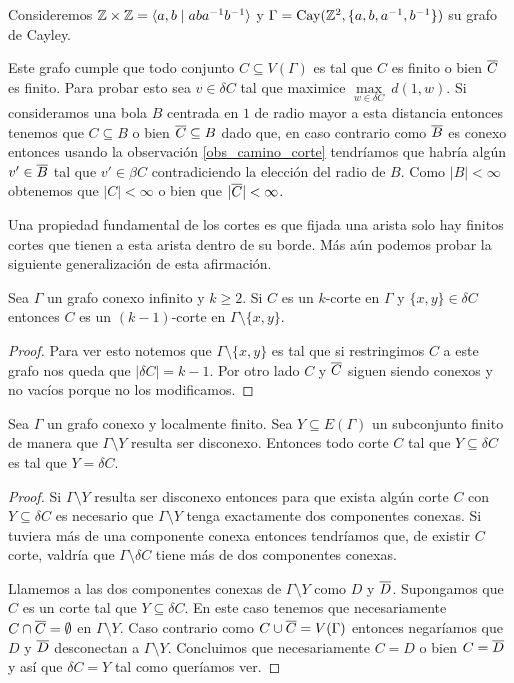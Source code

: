 \documentclass[tesis.tex]{subfiles}
\begin{document}
\begin{ej}
	Consideremos $\mathbb{Z} \times \mathbb{Z} = \langle a,b \mid aba^{-1}b^{-1} \rangle$ y 
	$\Gamma = \text{Cay}(\mathbb{Z}^2, \{ a, b,a^{-1},b^{-1} \})$ su grafo de Cayley.
	
	Este grafo cumple que todo conjunto $C \subseteq V(\Gamma)$ es tal que $C$ es finito o bien $\overline C$ es finito.
	Para probar esto sea $v \in \delta C$ tal que
	maximice $\underset{w \in \delta C}{\max} \ d(1,w)$.
	Si consideramos una bola $B$ centrada en $1$ de radio mayor a esta distancia entonces tenemos que $C \subseteq B$ o bien $\overline C \subseteq B$ dado que, en caso contrario como $\overline B$ es conexo entonces usando la observación \ref{obs_camino_corte} tendríamos que habría algún $v' \in \overline B$ tal que $v' \in \beta C$ contradiciendo la elección del radio de $B$.
	Como $|B| < \infty$ obtenemos que $|C| < \infty$ o bien que $|\overline C| < \infty$.
\end{ej}

Una propiedad fundamental de los cortes es que fijada una arista solo hay finitos cortes que tienen a esta arista dentro de su borde.	
Más aún podemos probar la siguiente generalización de esta afirmación.
\begin{lema}\label{obs_kCorte_restriccion}
	Sea $\Gamma$ un grafo conexo infinito y $k \ge 2$.
	Si $C$ es un $k$-corte en $\Gamma$ y $\{ x,y  \} \in \delta C$ entonces $C$ es un $(k-1)$-corte en $ \Gamma \setminus \{ x,y \} $.
\end{lema}

\begin{proof}
	Para ver esto notemos que $\Gamma \setminus \{ x,y \}$ es tal que si restringimos $C$ a este grafo nos queda que $|\delta C| = k-1$.
	Por otro lado $C$ y $\overline C$ siguen siendo conexos y no vacíos porque no los modificamos.
\end{proof}

\begin{lema}\label{lema_corte_disconexo_vertices}
	Sea $\Gamma$ un grafo conexo y localmente finito.
	Sea $Y \subseteq E(\Gamma)$ un subconjunto finito de manera que $\Gamma \setminus Y$ resulta ser disconexo.
	Entonces todo corte $C$ tal que $Y \subseteq \delta C$ es tal que $Y = \delta C$.
\end{lema}

\begin{proof}
	Si $\Gamma \setminus Y$ resulta ser disconexo entonces para que exista algún corte $C$ con $Y \subseteq \delta C$ es necesario que $\Gamma \setminus Y$ tenga exactamente dos componentes conexas.
	Si tuviera más de una componente conexa entonces tendríamos que, de existir $C$ corte, valdría que $\Gamma \setminus \delta C$ tiene más de dos componentes conexas.	
	
	Llamemos a las dos componentes conexas de $\Gamma \setminus Y$ como $D$ y  $\overline D$.
	Supongamos que $C$ es un corte tal que $Y \subseteq \delta C$. 
	En este caso tenemos que necesariamente $C \cap \overline C = \emptyset$ en $\Gamma \setminus Y$.
	Caso contrario como $C \cup \overline C = V(\Gamma)$ entonces negaríamos que $D$ y $\overline D$ desconectan a $\Gamma \setminus Y$.
	Concluimos que necesariamente $C = D$ o bien $C = \overline D$ y así que $\delta C = Y$ tal como queríamos ver.
\end{proof}
\end{document}
